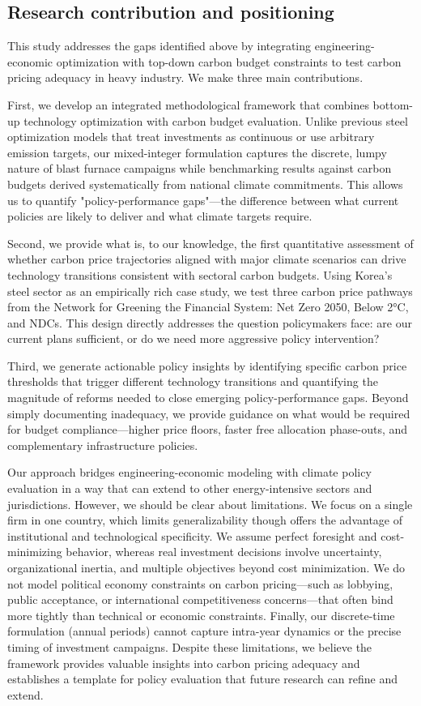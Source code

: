 \documentclass[preprint,1p,authoryear]{elsarticle}
\begin{document}
\subsection{Research contribution and positioning}

This study addresses the gaps identified above by integrating engineering-economic optimization with top-down carbon budget constraints to test carbon pricing adequacy in heavy industry. We make three main contributions.

First, we develop an integrated methodological framework that combines bottom-up technology optimization with carbon budget evaluation. Unlike previous steel optimization models that treat investments as continuous or use arbitrary emission targets, our mixed-integer formulation captures the discrete, lumpy nature of blast furnace campaigns while benchmarking results against carbon budgets derived systematically from national climate commitments. This allows us to quantify "policy-performance gaps"—the difference between what current policies are likely to deliver and what climate targets require.

Second, we provide what is, to our knowledge, the first quantitative assessment of whether carbon price trajectories aligned with major climate scenarios can drive technology transitions consistent with sectoral carbon budgets. Using Korea's steel sector as an empirically rich case study, we test three carbon price pathways from the Network for Greening the Financial System: Net Zero 2050, Below 2°C, and NDCs. This design directly addresses the question policymakers face: are our current plans sufficient, or do we need more aggressive policy intervention?

Third, we generate actionable policy insights by identifying specific carbon price thresholds that trigger different technology transitions and quantifying the magnitude of reforms needed to close emerging policy-performance gaps. Beyond simply documenting inadequacy, we provide guidance on what would be required for budget compliance—higher price floors, faster free allocation phase-outs, and complementary infrastructure policies.

Our approach bridges engineering-economic modeling with climate policy evaluation in a way that can extend to other energy-intensive sectors and jurisdictions. However, we should be clear about limitations. We focus on a single firm in one country, which limits generalizability though offers the advantage of institutional and technological specificity. We assume perfect foresight and cost-minimizing behavior, whereas real investment decisions involve uncertainty, organizational inertia, and multiple objectives beyond cost minimization. We do not model political economy constraints on carbon pricing—such as lobbying, public acceptance, or international competitiveness concerns—that often bind more tightly than technical or economic constraints. Finally, our discrete-time formulation (annual periods) cannot capture intra-year dynamics or the precise timing of investment campaigns. Despite these limitations, we believe the framework provides valuable insights into carbon pricing adequacy and establishes a template for policy evaluation that future research can refine and extend.
\end{document}
